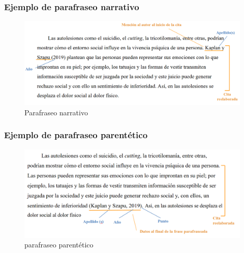 \documentclass[
11pt, %
]{beamer}
\begin{document}
\begin{frame}
	\frametitle{Ejemplo de parafraseo narrativo}

	\begin{exampleblock}{}
		\begin{figure}
			\centering
			\includegraphics[width=1\linewidth]{images/screenshot005}
			\caption{Parafraseo narrativo}
			\label{fig:screenshot005}
		\end{figure}
	\end{exampleblock}
\end{frame}

\begin{frame}
	\frametitle{Ejemplo de parafraseo parentético}

	\begin{exampleblock}{}
		\begin{figure}
			\centering
			\includegraphics[width=1\linewidth]{images/screenshot006}
			\caption{parafraseo parentético}
			\label{fig:screenshot006}
		\end{figure}
	\end{exampleblock}
\end{frame}
\end{document}
